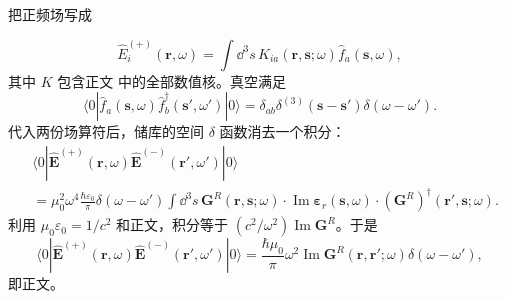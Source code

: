 \begin{derivation}
把正频场写成

\begin{equation*}
\hat E_i^{(+)}(\mathbf r,\omega)
=\int\dd^3 s\,K_{ia}(\mathbf r,\mathbf s;\omega)
\hat f_a(\mathbf s,\omega),
\end{equation*}
其中 \(K\) 包含正文 中的全部数值核。真空满足
\begin{equation*}
\langle0|\hat f_a(\mathbf s,\omega)
\hat f_b^\dagger(\mathbf s',\omega')|0\rangle
=\delta_{ab}\delta^{(3)}(\mathbf s-\mathbf s')\delta(\omega-\omega').
\end{equation*}
代入两份场算符后，储库的空间 \(\delta\) 函数消去一个积分：
\begin{align*}
&\langle0|\hat{\mathbf E}^{(+)}(\mathbf r,\omega)
\hat{\mathbf E}^{(-)}(\mathbf r',\omega')|0\rangle\\
&=\mu_0^2\omega^4\frac{\hbar\varepsilon_0}{\pi}
\delta(\omega-\omega')
\int\dd^3 s\,
\mathbf G^R(\mathbf r,\mathbf s;\omega)
\cdot\operatorname{Im}\boldsymbol\varepsilon_r(\mathbf s,\omega)
\cdot(\mathbf G^R)^\dagger(\mathbf r',\mathbf s;\omega).
\end{align*}
利用 \(\mu_0\varepsilon_0=1/c^2\) 和正文，积分等于 \((c^2/\omega^2)\operatorname{Im}\mathbf G^R\)。于是
\begin{equation*}
\langle0|\hat{\mathbf E}^{(+)}(\mathbf r,\omega)
\hat{\mathbf E}^{(-)}(\mathbf r',\omega')|0\rangle
=\frac{\hbar\mu_0}{\pi}\omega^2
\operatorname{Im}\mathbf G^R(\mathbf r,\mathbf r';\omega)
\delta(\omega-\omega'),
\end{equation*}
即正文。
\end{derivation}

